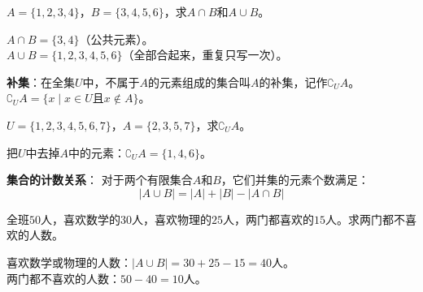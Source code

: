 \begin{example}
$A=\{1,2,3,4\}$，$B=\{3,4,5,6\}$，求$A\cap B$和$A\cup B$。
\end{example}
\begin{solution}
$A\cap B=\{3,4\}$（公共元素）。\\
$A\cup B=\{1,2,3,4,5,6\}$（全部合起来，重复只写一次）。
\end{solution}

\begin{center}
\qquad
{}
\end{center}

\textbf{补集}：在全集$U$中，不属于$A$的元素组成的集合叫$A$的补集，记作$\complement_UA$。
$\complement_UA=\{x\mid x\in U\text{且}x\notin A\}$。

\begin{example}
$U=\{1,2,3,4,5,6,7\}$，$A=\{2,3,5,7\}$，求$\complement_UA$。
\end{example}
\begin{solution}
把$U$中去掉$A$中的元素：$\complement_UA=\{1,4,6\}$。
\end{solution}

\textbf{集合的计数关系}：
对于两个有限集合$A$和$B$，它们并集的元素个数满足：
\[
|A\cup B| = |A| + |B| - |A\cap B|
\]

\begin{example}
全班$50$人，喜欢数学的$30$人，喜欢物理的$25$人，两门都喜欢的$15$人。求两门都不喜欢的人数。
\end{example}
\begin{solution}
喜欢数学或物理的人数：$|A\cup B| = 30 + 25 - 15 = 40$人。\\
两门都不喜欢的人数：$50 - 40 = 10$人。
\end{solution}

